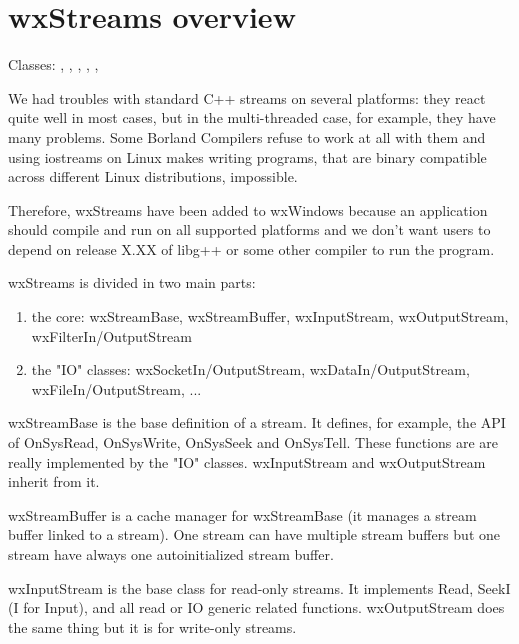 \section{wxStreams overview}\label{wxstreamoverview}

Classes: ,
 , ,
 ,
 ,


We had troubles with standard C++ streams on several platforms:
they react quite well in most cases, but in the multi-threaded case, for example,
they have many problems. Some Borland Compilers refuse to work at all
with them and using iostreams on Linux makes writing programs, that are
binary compatible across different Linux distributions, impossible.

Therefore, wxStreams have been added to wxWindows because an application should 
compile and run on all supported platforms and we don't want users to depend on release
X.XX of libg++ or some other compiler to run the program.

wxStreams is divided in two main parts:

\begin{enumerate}\itemsep=0pt
\item the core: wxStreamBase, wxStreamBuffer, wxInputStream, wxOutputStream,
wxFilterIn/OutputStream
\item the "IO" classes: wxSocketIn/OutputStream, wxDataIn/OutputStream, wxFileIn/OutputStream, ...
\end{enumerate}

wxStreamBase is the base definition of a stream. It defines, for example,
the API of OnSysRead, OnSysWrite, OnSysSeek and OnSysTell. These functions are
are really implemented by the "IO" classes.
wxInputStream and wxOutputStream inherit from it.

wxStreamBuffer is a cache manager for wxStreamBase (it manages a stream buffer
linked to a stream). One stream can have multiple stream buffers  but one stream
have always one autoinitialized stream buffer.

wxInputStream is the base class for read-only streams. It implements Read,
SeekI (I for Input), and all read or IO generic related functions.
wxOutputStream does the same thing but it is for write-only streams.

